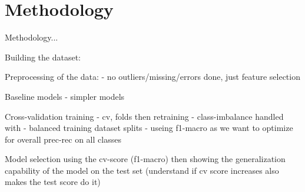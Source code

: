 \section{Methodology}

Methodology...

Building the dataset:
	
Preprocessing of the data:
	- no outliers/missing/errors done, just feature selection


Baseline models
	- simpler models

Cross-validation training
	- cv, folds then retraining
	- class-imbalance handled with
		- balanced training dataset splits
		- useing f1-macro as we want to optimize for overall prec-rec on all classes

Model selection
	using the cv-score (f1-macro)
	then showing the generalization capability of the model on the test set (understand if cv score increases also makes the test score do it)